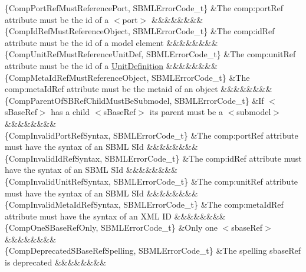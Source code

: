 \begin{DoxyParagraph}{}
\begin{longtabu}
\{Comp\+Port\+Ref\+Must\+Reference\+Port, S\+B\+M\+L\+Error\+Code\+\_\+t\} &The \textquotesingle{}comp\+:port\+Ref\textquotesingle{} attribute must be the \textquotesingle{}id\textquotesingle{} of a {\ttfamily $<$port$>$} &&&&&&&&\\
\{Comp\+Id\+Ref\+Must\+Reference\+Object, S\+B\+M\+L\+Error\+Code\+\_\+t\} &The \textquotesingle{}comp\+:id\+Ref\textquotesingle{} attribute must be the \textquotesingle{}id\textquotesingle{} of a model element &&&&&&&&\\
\{Comp\+Unit\+Ref\+Must\+Reference\+Unit\+Def, S\+B\+M\+L\+Error\+Code\+\_\+t\} &The \textquotesingle{}comp\+:unit\+Ref\textquotesingle{} attribute must be the \textquotesingle{}id\textquotesingle{} of a \hyperlink{class_unit_definition}{Unit\+Definition} &&&&&&&&\\
\{Comp\+Meta\+Id\+Ref\+Must\+Reference\+Object, S\+B\+M\+L\+Error\+Code\+\_\+t\} &The \textquotesingle{}comp\+:meta\+Id\+Ref\textquotesingle{} attribute must be the \textquotesingle{}metaid\textquotesingle{} of an object &&&&&&&&\\
\{Comp\+Parent\+Of\+S\+B\+Ref\+Child\+Must\+Be\+Submodel, S\+B\+M\+L\+Error\+Code\+\_\+t\} &If {\ttfamily $<$s\+Base\+Ref$>$} has a child {\ttfamily $<$s\+Base\+Ref$>$} its parent must be a {\ttfamily $<$submodel$>$} &&&&&&&&\\
\{Comp\+Invalid\+Port\+Ref\+Syntax, S\+B\+M\+L\+Error\+Code\+\_\+t\} &The \textquotesingle{}comp\+:port\+Ref\textquotesingle{} attribute must have the syntax of an S\+B\+ML S\+Id &&&&&&&&\\
\{Comp\+Invalid\+Id\+Ref\+Syntax, S\+B\+M\+L\+Error\+Code\+\_\+t\} &The \textquotesingle{}comp\+:id\+Ref\textquotesingle{} attribute must have the syntax of an S\+B\+ML S\+Id &&&&&&&&\\
\{Comp\+Invalid\+Unit\+Ref\+Syntax, S\+B\+M\+L\+Error\+Code\+\_\+t\} &The \textquotesingle{}comp\+:unit\+Ref\textquotesingle{} attribute must have the syntax of an S\+B\+ML S\+Id &&&&&&&&\\
\{Comp\+Invalid\+Meta\+Id\+Ref\+Syntax, S\+B\+M\+L\+Error\+Code\+\_\+t\} &The \textquotesingle{}comp\+:meta\+Id\+Ref\textquotesingle{} attribute must have the syntax of an X\+ML ID &&&&&&&&\\
\{Comp\+One\+S\+Base\+Ref\+Only, S\+B\+M\+L\+Error\+Code\+\_\+t\} &Only one {\ttfamily $<$sbase\+Ref$>$} &&&&&&&&\\
\{Comp\+Deprecated\+S\+Base\+Ref\+Spelling, S\+B\+M\+L\+Error\+Code\+\_\+t\} &The spelling \textquotesingle{}sbase\+Ref\textquotesingle{} is deprecated &&&&&&&&\\

\end{longtabu}
\end{DoxyParagraph}
